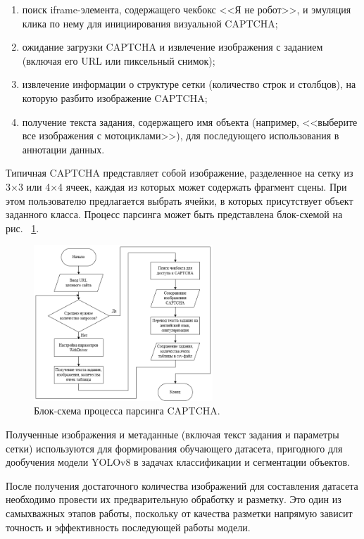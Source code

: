 \begin{enumerate}
    \item поиск iframe-элемента, содержащего чекбокс <<Я не робот>>, и эмуляция 
    клика по нему для инициирования визуальной CAPTCHA;
    \item ожидание загрузки CAPTCHA и извлечение изображения с заданием (включая 
    его URL или пиксельный снимок);
    \item извлечение информации о структуре сетки (количество строк и столбцов), 
    на которую разбито изображение CAPTCHA;
    \item получение текста задания, содержащего имя объекта (например, <<выберите 
    все изображения с мотоциклами>>), для последующего использования в аннотации 
    данных.
\end{enumerate}

Типичная CAPTCHA представляет собой изображение, разделенное на сетку из 3×3 или 
4×4 ячеек, каждая из которых может содержать фрагмент сцены. При этом 
пользователю предлагается выбрать ячейки, в которых присутствует объект заданного 
класса. Процесс парсинга может быть представлена блок-схемой на рис.~
\ref{fig:captcha-flow}.

\begin{figure}[H]
    \centering
    \includegraphics[width=0.6\textwidth]{
        imgs/imagecaptcha/image_captcha_flow.png
    }
    \caption{Блок-схема процесса парсинга CAPTCHA.}
    \label{fig:captcha-flow}
\end{figure}
\vspace{-0.5cm}

Полученные изображения и метаданные (включая текст задания и параметры сетки) 
используются для формирования обучающего датасета, пригодного для дообучения 
модели YOLOv8 в задачах классификации и сегментации объектов.

После получения достаточного количества изображений для составления датасета 
необходимо провести их предварительную обработку и разметку. Это один из 
самыхважных этапов работы, поскольку от качества разметки напрямую зависит 
точность и эффективность последующей работы модели.

